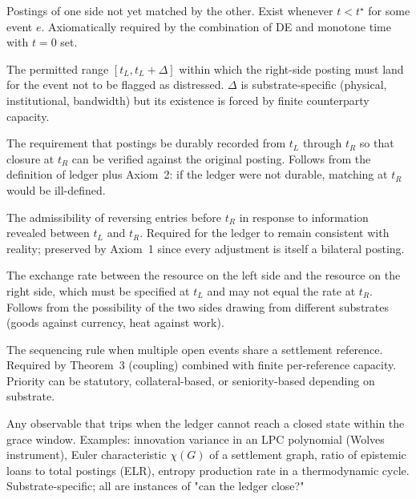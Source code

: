 \documentclass[11pt]{article}
\begin{document}
\begin{description}[leftmargin=0pt, itemindent=0pt, labelsep=0.4em, labelwidth=!, font=\bfseries]

\item[Open items.] Postings of one side not yet matched by the other. Exist whenever $t < t^\star$ for some event $e$. Axiomatically required by the combination of DE and monotone time with $t = 0$ set.

\item[Grace window.] The permitted range $[t_L, t_L + \Delta]$ within which the right-side posting must land for the event not to be flagged as distressed. $\Delta$ is substrate-specific (physical, institutional, bandwidth) but its existence is forced by finite counterparty capacity.

\item[Witnessing.] The requirement that postings be durably recorded from $t_L$ through $t_R$ so that closure at $t_R$ can be verified against the original posting. Follows from the definition of ledger plus Axiom~2: if the ledger were not durable, matching at $t_R$ would be ill-defined.

\item[Adjustability.] The admissibility of reversing entries before $t_R$ in response to information revealed between $t_L$ and $t_R$. Required for the ledger to remain consistent with reality; preserved by Axiom~1 since every adjustment is itself a bilateral posting.

\item[Shadow price.] The exchange rate between the resource on the left side and the resource on the right side, which must be specified at $t_L$ and may not equal the rate at $t_R$. Follows from the possibility of the two sides drawing from different substrates (goods against currency, heat against work).

\item[Priority order.] The sequencing rule when multiple open events share a settlement reference. Required by Theorem~3 (coupling) combined with finite per-reference capacity. Priority can be statutory, collateral-based, or seniority-based depending on substrate.

\item[Closure-failure detector.] Any observable that trips when the ledger cannot reach a closed state within the grace window. Examples: innovation variance in an LPC polynomial (Wolves instrument), Euler characteristic $\chi(G)$ of a settlement graph, ratio of epistemic loans to total postings (ELR), entropy production rate in a thermodynamic cycle. Substrate-specific; all are instances of "can the ledger close?"

\end{description}
\end{document}
